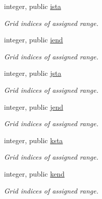 \textbf{ }\par
\begin{DoxyCompactItemize}
\item 
integer, public \mbox{\hyperlink{namespacempi__subdomain_ab8925faaa6f45326c1d11efa37e03566}{ista}}
\begin{DoxyCompactList}\small\item\em Grid indices of assigned range. \end{DoxyCompactList}\item 
integer, public \mbox{\hyperlink{namespacempi__subdomain_abbd7d35107c53bcfd2b2b52771f4aa67}{iend}}
\begin{DoxyCompactList}\small\item\em Grid indices of assigned range. \end{DoxyCompactList}\item 
integer, public \mbox{\hyperlink{namespacempi__subdomain_ac85bfba1caf77f9c3c0047fe9450fee6}{jsta}}
\begin{DoxyCompactList}\small\item\em Grid indices of assigned range. \end{DoxyCompactList}\item 
integer, public \mbox{\hyperlink{namespacempi__subdomain_a06433a0d1a081c51202a0010c21c9d36}{jend}}
\begin{DoxyCompactList}\small\item\em Grid indices of assigned range. \end{DoxyCompactList}\item 
integer, public \mbox{\hyperlink{namespacempi__subdomain_acd499eb1d07159aa9f5c878f9519b00f}{ksta}}
\begin{DoxyCompactList}\small\item\em Grid indices of assigned range. \end{DoxyCompactList}\item 
integer, public \mbox{\hyperlink{namespacempi__subdomain_af9934313b1ccbcb09f30916df3326076}{kend}}
\begin{DoxyCompactList}\small\item\em Grid indices of assigned range. \end{DoxyCompactList}\end{DoxyCompactItemize}

